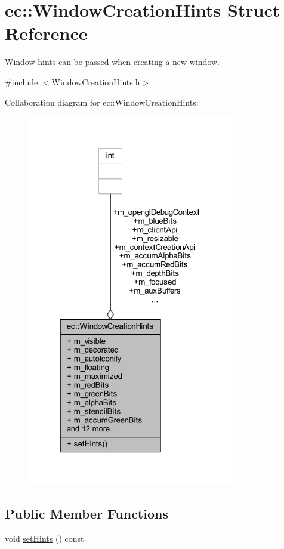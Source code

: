 \hypertarget{structec_1_1_window_creation_hints}{}\section{ec\+:\+:Window\+Creation\+Hints Struct Reference}
\label{structec_1_1_window_creation_hints}


\mbox{\hyperlink{classec_1_1_window}{Window}} hints can be passed when creating a new window.  




{\ttfamily \#include $<$Window\+Creation\+Hints.\+h$>$}



Collaboration diagram for ec\+:\+:Window\+Creation\+Hints\+:\nopagebreak
\begin{figure}[H]
\begin{center}
\leavevmode
\includegraphics[width=256pt]{structec_1_1_window_creation_hints__coll__graph}
\end{center}
\end{figure}
\subsection*{Public Member Functions}
\begin{DoxyCompactItemize}
\item 
void \mbox{\hyperlink{structec_1_1_window_creation_hints_ae62c9820ab420fb7ada244293c6ffa27}{set\+Hints}} () const
\end{DoxyCompactItemize}
